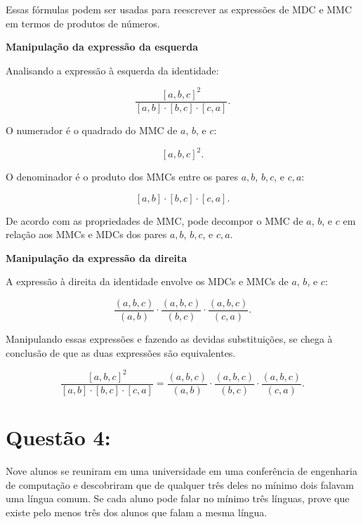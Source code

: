 Essas fórmulas podem ser usadas para reescrever as expressões de MDC e MMC em termos de produtos de números.

\vspace{10pt}

\textbf{Manipulação da expressão da esquerda}

Analisando a expressão à esquerda da identidade:

\[
\frac{[a,b,c]^2}{[a,b] \cdot [b,c] \cdot [c,a]}.
\]

O numerador é o quadrado do MMC de \(a\), \(b\), e \(c\):

\[
[a, b, c]^2.
\]

O denominador é o produto dos MMCs entre os pares \(a, b\), \(b, c\), e \(c, a\):

\[
[a, b] \cdot [b, c] \cdot [c, a].
\]

De acordo com as propriedades de MMC, pode decompor o MMC de \(a\), \(b\), e \(c\) em relação aos MMCs e MDCs dos pares \(a, b\), \(b, c\), e \(c, a\).

\vspace{10pt}

\textbf{Manipulação da expressão da direita}

A expressão à direita da identidade envolve os MDCs e MMCs de \(a\), \(b\), e \(c\):

\[
\frac{(a, b, c)}{(a, b)} \cdot \frac{(a, b, c)}{(b, c)} \cdot \frac{(a, b, c)}{(c, a)}.
\]

\vspace{10pt}


Manipulando essas expressões e fazendo as devidas substituições, se chega à conclusão de que as duas expressões são equivalentes.

\vspace{10pt}


\[
\boxed{
\frac{[a,b,c]^2}{[a,b] \cdot [b,c] \cdot [c,a]} = \frac{(a,b,c)}{(a,b)} \cdot \frac{(a,b,c)}{(b,c)} \cdot \frac{(a,b,c)}{(c,a)}.
}
\]


\section*{Questão 4:}
Nove alunos se reuniram em uma universidade em uma conferência de engenharia de computação e descobriram que de qualquer três deles no mínimo dois falavam uma língua comum. Se cada aluno pode falar no mínimo três línguas, prove que existe pelo menos três dos alunos que falam a mesma língua.

